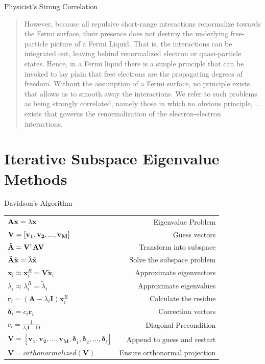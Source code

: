 \documentclass[10pt]{beamer}
\begin{document}
{{{{{{{{{{{{{{{{{
\begin{frame}{Physicist's Strong Correlation}
  \centering
	\begin{quote}
  	However, because all repulsive short-range interactions renormalize towards the Fermi surface, 
  	their presence does not destroy the underlying free-particle picture of a Fermi Liquid. That 
  	is, the interactions can be integrated out, leaving behind renormalized electron or 
  	quasi-particle states. Hence, in a Fermi liquid there is a simple principle that can be invoked 
  	to lay plain that free electrons are the propagating degrees of freedom. Without the assumption 
  	of a Fermi surface, no principle exists that allows us to smooth away the interactions. 
  	\alert{We 
  	refer to such problems as being strongly correlated, namely those in which no obvious 
  	principle, ... exists that governs the renormalization of the electron-electron interactions.} 
	\end{quote}
	
\end{frame}

\section{Iterative Subspace Eigenvalue Methods}
{%
\begin{frame}{Davidson's Algorithm}
  \begin{tabular}{l r}
    $\bf{Ax}=\lambda\bf{x}$         & Eigenvalue Problem \\
    $\bf{V}=[\bf{v_1,v_2,...,v_M}]$	& Guess vectors \\
    $\bf{\tilde{A}} = \bf{V}^\dag\bf{AV}$  & Transform into subspace\\ 
    $\bf{\tilde{A}\tilde{x}}=\tilde{\lambda}\bf{\tilde{x}}$ & Solve the subspace problem\\
  	$\mathbf{x_i} \approx \mathbf{x}_i^R = \mathbf{V\tilde{x}}_i$ & Approximate eigenvectors\\
  	$\lambda_i \approx \lambda_i^R = \tilde{\lambda}_i$ & Approximate eigenvalues \\
    $\mathbf{r}_i=\left(\mathbf{A}-\lambda_i\mathbf{I}\right)\mathbf{x}_i^R $ & Calculate the 
    residue \\
    $\mathbf{\delta}_i = c_i\mathbf{r}_i$ & Correction vectors \\
    $c_i = \frac{1}{\lambda_i\mathbf{I}-\mathbf{D}}$ & Diagonal Precondition \\
    $\mathbf{V} = 
    [\mathbf{v_1,v_2,...,v_M}\mathbf{,\delta}_1\mathbf{,\delta}_2,...\mathbf{,\delta}_l]$ & Append 
    to guess and restart \\ 
    $\mathbf{V} = orthonormalized(\mathbf{V})$ & Ensure orthonormal projection
  \end{tabular}
\end{frame}

}}}}}}}}}}}}}}}}}}
\end{document}
